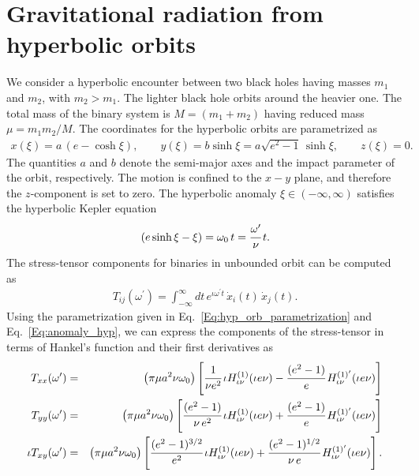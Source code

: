 \documentclass[aps,prd]{revtex4-2}
\begin{document}
\newpage

\section{Gravitational radiation from hyperbolic orbits}\label{Sec:Hyperbolic_Gravity}

We consider a hyperbolic encounter between two black holes having masses $m_{1}$ and $m_{2}$, with $m_{2} > m_{1}$. The lighter black hole orbits around the heavier one. The total mass of the binary system is $M = (m_{1} + m_{2})$ having reduced mass $\mu = m_{1}m_{2}/M$.  The coordinates for the hyperbolic orbits are parametrized as
\begin{eqnarray}\label{Eq:hyp_orb_parametrization}
    x(\xi) = a\,(e - \cosh{\xi}), \qquad y(\xi) = b\sinh{\xi} = a\sqrt{e^2 - 1}\,\sinh{\xi}, \qquad z(\xi) = 0.
\end{eqnarray}
The quantities $a$ and $b$ denote the semi-major axes and the impact parameter of the orbit, respectively. The motion is confined to the $x-y$ plane, and therefore the $z$-component is set to zero. The hyperbolic anomaly $\xi \in (-\infty, \infty)$ satisfies the hyperbolic Kepler equation
\begin{eqnarray}\label{Eq:anomaly_hyp}
    (e\sinh{\xi} - \xi) = \omega_{0}\,t = \cfrac{\omega^{\prime}}{\nu} \,t.
\end{eqnarray}
The stress-tensor components for binaries in unbounded orbit can be computed as 
\begin{eqnarray}
    T_{ij}(\omega^{\prime}) = \int_{-\infty}^{\infty} dt\,e^{\iota\omega^{\prime}t}\, \dot{x}_{i}(t)\,\dot{x}_{j}(t).
\end{eqnarray}
Using the parametrization given in Eq.~\eqref{Eq:hyp_orb_parametrization} and Eq.~\eqref{Eq:anomaly_hyp}, we can express the components of the stress-tensor in terms of Hankel's function and their first derivatives as~\cite{Hait:2022ukn}
\begin{eqnarray}\label{Eq:stress-tensor}
    T_{xx}(\omega^{\prime}) &=& \left(\pi\mu a^{2}\nu\omega_{0}\right)\left[\cfrac{1}{\nu e^{2}}\,\iota H_{\iota \nu}^{(1)} (\iota e\nu) - \cfrac{(e^2 - 1)}{e}\, H_{\iota\nu}^{(1)^{\prime}}(\iota e\nu)\right]\nonumber \\
    T_{yy}(\omega^{\prime}) & = & \left(\pi \mu a^{2} \nu \omega_{0} \right)\left[\cfrac{(e^2 -1)}{\nu\,e^2}\,\iota H_{\iota \nu}^{(1)} (\iota e\nu) + \cfrac{(e^2 - 1)}{e}\, H_{\iota\nu}^{(1)^{\prime}}(\iota e\nu)\right] \nonumber \\
    \iota T_{xy}(\omega^{\prime}) &=& \left(\pi \mu a^{2} \nu \omega_{0} \right)\left[\cfrac{(e^{2} -1)^{3/2}}{e^2}\,\iota H_{\iota \nu}^{(1)} (\iota e\nu) + \cfrac{(e^2 - 1)^{1/2}}{\nu\,e}\, H_{\iota\nu}^{(1)^{\prime}}(\iota e\nu)\right].
\end{eqnarray}
\end{document}
